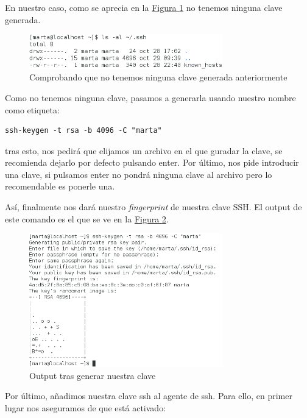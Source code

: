 \documentclass[10pt,a4paper,spanish]{article}
\numberwithin{equation}{section} %
\numberwithin{figure}{section} %
\numberwithin{table}{section} %
\begin{document}
En nuestro caso, como se aprecia en la \hyperref[lsssh]{Figura \ref*{lsssh}} no tenemos ninguna clave generada.

\begin{figure}[!h]
    \centering
    \includegraphics[width=0.75\textwidth]{4}
    \caption{Comprobando que no tenemos ninguna clave generada anteriormente}
    \label{lsssh}
\end{figure}

Como no tenemos ninguna clave, pasamos a generarla usando nuestro nombre como etiqueta:

\begin{verbatim}
ssh-keygen -t rsa -b 4096 -C "marta"
\end{verbatim}

tras esto, nos pedirá que elijamos un archivo en el que guradar la clave, se recomienda dejarlo por defecto pulsando enter. Por último, nos pide introducir una clave, si pulsamos enter no pondrá ninguna clave al archivo pero lo recomendable es ponerle una.

Así, finalmente nos dará nuestro \textit{fingerprint} de nuestra clave SSH. El output de este comando es el que se ve en la \hyperref[clavessh]{Figura \ref*{clavessh}}.

\begin{figure}[!h]
    \centering
    \includegraphics[width=0.75\textwidth]{5}
    \caption{Output tras generar nuestra clave}
    \label{clavessh}
\end{figure}

Por último, añadimos nuestra clave ssh al agente de ssh. Para ello, en primer lugar nos aseguramos de que está activado:
\end{document}
